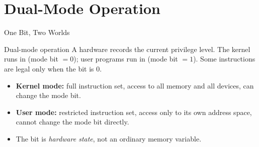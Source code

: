\documentclass[aspectratio=169]{beamer}
\begin{document}
\section{Dual-Mode Operation}


\begin{frame}{One Bit, Two Worlds}
  \begin{block}{Dual-mode operation}
    A hardware  records the current privilege level. The kernel
    runs in  (mode bit $=0$); user programs run in
     (mode bit $=1$). Some instructions are legal only when the
    bit is $0$.
  \end{block}
  \begin{itemize}
    \item \textbf{Kernel mode:} full instruction set, access to all memory and
      all devices, can change the mode bit.
    \item \textbf{User mode:} restricted instruction set, access only to its own
      address space, cannot change the mode bit directly.
    \item The bit is \emph{hardware state}, not an ordinary memory variable.
  \end{itemize}
  \vspace{0.15cm}
\end{frame}
\end{document}
